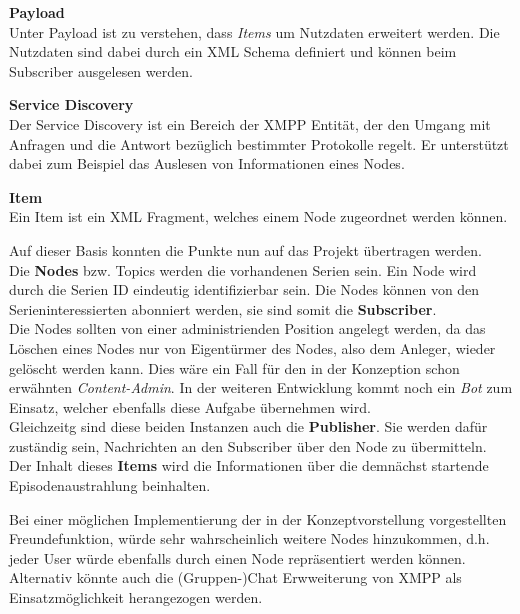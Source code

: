 \vspace{0.2cm}

\textbf{Payload}\\
Unter Payload ist zu verstehen, dass \textit{Items} um Nutzdaten erweitert werden. Die Nutzdaten sind dabei durch ein XML Schema definiert und können beim Subscriber ausgelesen werden.

\vspace{0.2cm}

\textbf{Service Discovery}\\
Der Service Discovery ist ein Bereich der XMPP Entität, der den Umgang mit Anfragen und die Antwort bezüglich bestimmter Protokolle regelt. Er unterstützt dabei zum Beispiel das Auslesen von Informationen eines Nodes.

\vspace{0.2cm}

\textbf{Item}\\
Ein Item ist ein XML Fragment, welches einem Node zugeordnet werden können.

\vspace{0.2cm}

Auf dieser Basis konnten die Punkte nun auf das Projekt übertragen werden.\\

Die \textbf{Nodes} bzw. Topics werden die vorhandenen Serien sein. Ein Node wird durch die Serien ID eindeutig identifizierbar sein. Die Nodes können von den Serieninteressierten abonniert werden, sie sind somit die \textbf{Subscriber}.\\
Die Nodes sollten von einer administrienden Position angelegt werden, da das Löschen eines Nodes nur von Eigentürmer des Nodes, also dem Anleger, wieder gelöscht werden kann. Dies wäre ein Fall für den in der Konzeption schon erwähnten \textit{Content-Admin}. In der weiteren Entwicklung kommt noch ein  \textit{Bot} zum Einsatz, welcher ebenfalls diese Aufgabe übernehmen wird.\\
Gleichzeitg sind diese beiden Instanzen auch die \textbf{Publisher}. Sie werden dafür zuständig sein, Nachrichten an den Subscriber über den Node zu übermitteln. Der Inhalt dieses \textbf{Items} wird die Informationen über die demnächst startende Episodenaustrahlung beinhalten.

\vspace{0.2cm}

Bei einer möglichen Implementierung der in der Konzeptvorstellung vorgestellten Freundefunktion, würde sehr wahrscheinlich weitere Nodes hinzukommen, d.h. jeder User würde ebenfalls durch einen Node repräsentiert werden können. Alternativ könnte auch die (Gruppen-)Chat Erwweiterung von XMPP als Einsatzmöglichkeit herangezogen werden.


